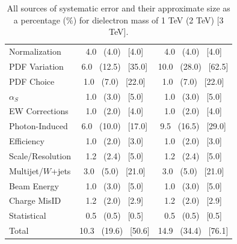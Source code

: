 \begin {table}[h]
\begin{center}
\begin{tabular}{ | l | c c | }
            \hline
            Normalization       & 4.0 ~(4.0) ~[4.0]           & 4.0 ~(4.0) ~[4.0] \\
            PDF Variation       & 6.0 ~(12.5) ~[35.0]         & 10.0 ~(28.0) ~[62.5] \\
            PDF Choice          & 1.0 ~(7.0) ~[22.0]          & 1.0 ~(7.0) ~[22.0] \\
            $\alpha_S$          & 1.0 ~(3.0) ~[5.0]           & 1.0 ~(3.0) ~[5.0] \\
            EW Corrections      & 1.0 ~(2.0) ~[4.0]           & 1.0 ~(2.0) ~[4.0] \\
            Photon-Induced      & 6.0 ~(10.0) ~[17.0]         & 9.5 ~(16.5) ~[29.0]    \\
            Efficiency          & 1.0 ~(2.0) ~[3.0]           & 1.0 ~(2.0) ~[3.0] \\
            Scale/Resolution    & 1.2 ~(2.4) ~[5.0]           & 1.2 ~(2.4) ~[5.0] \\
            Multijet/$W$+jets  & 3.0 ~(5.0) ~[21.0]          & 3.0 ~(5.0) ~[21.0] \\
            Beam Energy         & 1.0 ~(3.0) ~[5.0]           & 1.0 ~(3.0) ~[5.0] \\
            Charge MisID        & 1.2 ~(2.0) ~[2.9]           & 1.2 ~(2.0) ~[2.9] \\
            Statistical         & 0.5 ~(0.5) ~[0.5]           & 0.5 ~(0.5) ~[0.5] \\
            \hline   
            Total               & 10.3 ~(19.6) ~[50.6]        & 14.9 ~(34.4) ~[76.1] \\ 
            \hline
        \end{tabular}
        \caption{All sources of systematic error and their approximate size as a percentage (\%) for dielectron mass of 1 TeV (2 TeV) [3 TeV].}
        \label{tab:sys}
        \end{center}
    \end {table}


